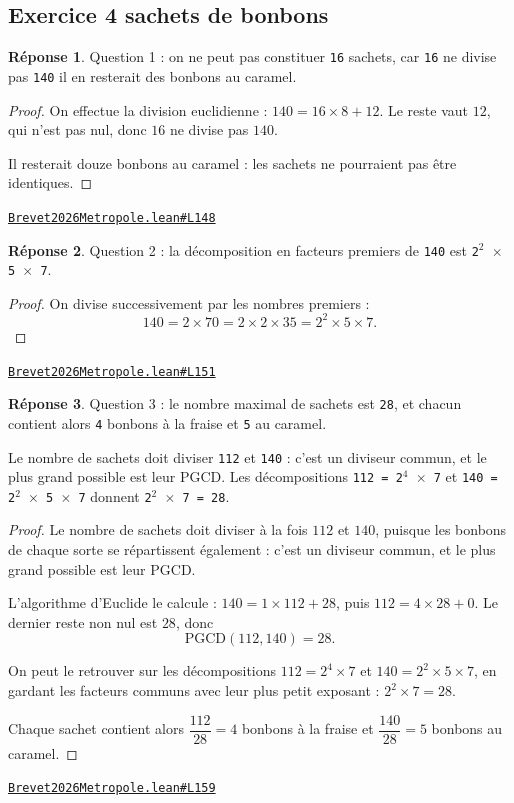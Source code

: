 \documentclass[11pt,a4paper]{article}
\theoremstyle{definition}
\theoremstyle{plain}
\theoremstyle{definition}
\newtheorem*{reponse}{Réponse}
\newcommand{\source}[2]{\par\smallskip\noindent\hfill{\footnotesize\href{#1}{\texttt{#2}}}\par\smallskip}
\begin{document}
\subsection{Exercice 4 \textemdash{} sachets de bonbons}

\begin{reponse}
Question 1 : on ne peut pas constituer \texttt{16} sachets, car \texttt{16} ne divise pas
\texttt{140} \textemdash{} il en resterait des bonbons au caramel.
\end{reponse}
\begin{proof}
On effectue la division euclidienne : $140 = 16 \times 8 + 12$. Le reste vaut $12$, qui
n'est pas nul, donc $16$ ne divise pas $140$.

Il resterait douze bonbons au caramel : les sachets ne pourraient pas être identiques.
\end{proof}
\source{https://github.com/Commutator-IO/learn-lean/blob/main/exams/2026/Brevet2026Metropole.lean\#L148}{Brevet2026Metropole.lean\#L148}

\begin{reponse}
Question 2 : la décomposition en facteurs premiers de \texttt{140} est \texttt{2\(^{2}\) \(\times\) 5 \(\times\) 7}.
\end{reponse}
\begin{proof}
On divise successivement par les nombres premiers :
\[ 140 = 2 \times 70 = 2 \times 2 \times 35 = 2^2 \times 5 \times 7 . \]
\end{proof}
\source{https://github.com/Commutator-IO/learn-lean/blob/main/exams/2026/Brevet2026Metropole.lean\#L151}{Brevet2026Metropole.lean\#L151}

\begin{reponse}
Question 3 : le nombre maximal de sachets est \texttt{28}, et chacun contient alors
\texttt{4} bonbons à la fraise et \texttt{5} au caramel.

Le nombre de sachets doit diviser \texttt{112} et \texttt{140} : c'est un diviseur commun, et le
plus grand possible est leur PGCD. Les décompositions \texttt{112 = 2\(^{4}\) \(\times\) 7} et
\texttt{140 = 2\(^{2}\) \(\times\) 5 \(\times\) 7} donnent \texttt{2\(^{2}\) \(\times\) 7 = 28}.
\end{reponse}
\begin{proof}
Le nombre de sachets doit diviser à la fois $112$ et $140$, puisque les bonbons de chaque
sorte se répartissent également : c'est un diviseur commun, et le plus grand possible est
leur PGCD.

L'algorithme d'Euclide le calcule : $140 = 1 \times 112 + 28$, puis $112 = 4 \times 28 +
0$. Le dernier reste non nul est $28$, donc
\[ \mathrm{PGCD}(112, 140) = 28 . \]

On peut le retrouver sur les décompositions $112 = 2^4 \times 7$ et $140 = 2^2 \times 5
\times 7$, en gardant les facteurs communs avec leur plus petit exposant : $2^2 \times 7 =
28$.

Chaque sachet contient alors $\dfrac{112}{28} = 4$ bonbons à la fraise et
$\dfrac{140}{28} = 5$ bonbons au caramel.
\end{proof}
\source{https://github.com/Commutator-IO/learn-lean/blob/main/exams/2026/Brevet2026Metropole.lean\#L159}{Brevet2026Metropole.lean\#L159}
\end{document}
